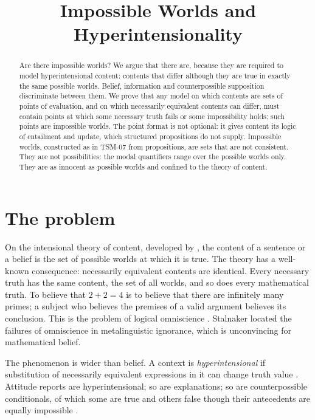 \documentclass{situationist-preprint}
\title{Impossible Worlds and Hyperintensionality}
\begin{document}
\maketitle

\begin{abstract}
Are there impossible worlds? We argue that there are, because they are required to model hyperintensional content: contents that differ although they are true in exactly the same possible worlds. Belief, information and counterpossible supposition discriminate between them. We prove that any model on which contents are sets of points of evaluation, and on which necessarily equivalent contents can differ, must contain points at which some necessary truth fails or some impossibility holds; such points are impossible worlds. The point format is not optional: it gives content its logic of entailment and update, which structured propositions do not supply. Impossible worlds, constructed as in TSM-07 from propositions, are sets that are not consistent. They are not possibilities: the modal quantifiers range over the possible worlds only. They are as innocent as possible worlds and confined to the theory of content.
\end{abstract}

\section{The problem}

On the intensional theory of content, developed by \citet{Stalnaker1984}, the content of a sentence or a belief is the set of possible worlds at which it is true. The theory has a well-known consequence: necessarily equivalent contents are identical. Every necessary truth has the same content, the set of all worlds, and so does every mathematical truth. To believe that $2+2=4$ is to believe that there are infinitely many primes; a subject who believes the premises of a valid argument believes its conclusion. This is the problem of logical omniscience \citep{Hintikka1975}. Stalnaker located the failures of omniscience in metalinguistic ignorance, which is unconvincing for mathematical belief.

The phenomenon is wider than belief. A context is \emph{hyperintensional} if substitution of necessarily equivalent expressions in it can change truth value \citep{Cresswell1975}. Attitude reports are hyperintensional; so are explanations; so are counterpossible conditionals, of which some are true and others false though their antecedents are equally impossible \citep{Nolan1997}.
\end{document}
